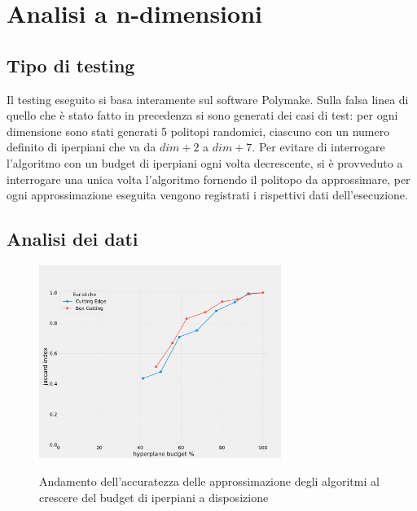 \chapter{Analisi a n-dimensioni}
\section{Tipo di testing}

Il testing eseguito si basa interamente sul software Polymake.
Sulla falsa linea di quello che è stato fatto in precedenza si sono generati dei casi di test:
per ogni dimensione sono stati generati 5 politopi randomici, ciascuno con un numero definito 
di iperpiani che va da $dim+2$ a $dim+7$.
Per evitare di interrogare l'algoritmo con un budget di iperpiani ogni volta 
decrescente, si è provveduto a interrogare una unica volta l'algoritmo fornendo il politopo
da approssimare, per ogni approssimazione eseguita vengono registrati i 
rispettivi dati dell'esecuzione.\\


\section{Analisi dei dati}

\begin{figure}[H]
    \centering
        \includegraphics[width=0.7\textwidth]{media/report_ndim/ndim_jaccard.pdf} \\
        \caption{Andamento dell'accuratezza delle approssimazione degli algoritmi 
        al crescere del budget di iperpiani a disposizione}
\end{figure}

